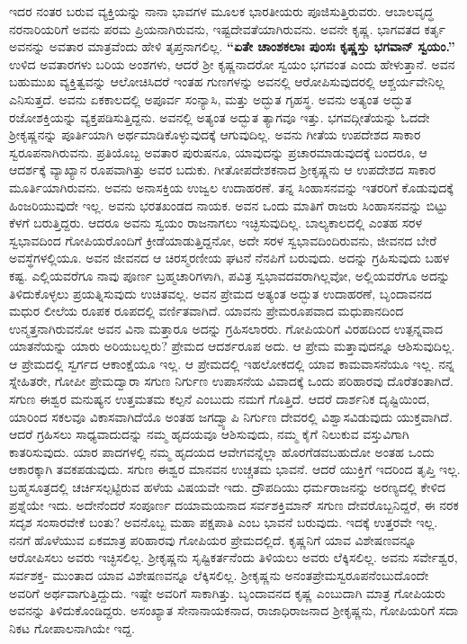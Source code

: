 ಇದರ ನಂತರ ಬರುವ ವ್ಯಕ್ತಿಯನ್ನು ನಾನಾ ಭಾವಗಳ ಮೂಲಕ ಭಾರತೀಯರು ಪೂಜಿಸುತ್ತಿರುವರು. ಆಬಾಲವೃದ್ಧ ನರನಾರಿಯರಿಗೆ ಅವನು ಪರಮ ಪ್ರಿಯನಾಗಿರುವನು, ಇಷ್ಟದೇವತೆಯಾಗಿರುವನು. ಅವನೇ ಕೃಷ್ಣ. ಭಾಗವತದ ಕರ್ತೃ ಅವನನ್ನು ಅವತಾರ ಮಾತ್ರವೆಂದು ಹೇಳಿ ತೃಪ್ತನಾಗಲಿಲ್ಲ. \textbf{“ಏತೇ ಚಾಂಶಕಲಾಃ ಪುಂಸಃ ಕೃಷ್ಣಸ್ತು ಭಗವಾನ್​ ಸ್ವಯಂ.”} ಉಳಿದ ಅವತಾರಗಳು ಬರಿಯ ಅಂಶಗಳು, ಆದರೆ ಶ‍್ರೀ ಕೃಷ್ಣನಾದರೋ ಸ್ವಯಂ ಭಗವಂತ ಎಂದು ಹೇಳುತ್ತಾನೆ. ಅವನ ಬಹುಮುಖ ವ್ಯಕ್ತಿತ್ವವನ್ನು ಆಲೋಚಿಸಿದರೆ ಇಂತಹ ಗುಣಗಳನ್ನು ಅವನಲ್ಲಿ ಆರೋಪಿಸುವುದರಲ್ಲಿ ಆಶ್ಚರ್ಯವೇನಿಲ್ಲ ಎನಿಸುತ್ತದೆ. ಅವನು ಏಕಕಾಲದಲ್ಲಿ ಅಪೂರ್ವ ಸಂನ್ಯಾಸಿ, ಮತ್ತು ಅದ್ಭುತ ಗೃಹಸ್ಥ. ಅವನು ಅತ್ಯಂತ ಅದ್ಭುತ ರಜೋಶಕ್ತಿಯನ್ನು ವ್ಯಕ್ತಪಡಿಸುತ್ತಿದ್ದನು. ಅವನಲ್ಲಿ ಅತ್ಯಂತ ಅದ್ಭುತ ತ್ಯಾಗವೂ ಇತ್ತು. ಭಗವದ್ಗೀತೆಯನ್ನು ಓದದೇ ಶ‍್ರೀಕೃಷ್ಣನನ್ನು ಪೂರ್ತಿಯಾಗಿ ಅರ್ಥಮಾಡಿಕೊಳ್ಳುವುದಕ್ಕೆ ಆಗುವುದಿಲ್ಲ. ಅವನು ಗೀತೆಯ ಉಪದೇಶದ ಸಾಕಾರ ಸ್ವರೂಪನಾಗಿರುವನು. ಪ್ರತಿಯೊಬ್ಬ ಅವತಾರ ಪುರುಷನೂ, ಯಾವುದನ್ನು ಪ್ರಚಾರಮಾಡುವುದಕ್ಕೆ ಬಂದರೂ, ಆ ಆದರ್ಶಕ್ಕೆ ವ್ಯಾಖ್ಯಾನ ರೂಪವಾಗಿತ್ತು ಅವರ ಬದುಕು. ಗೀತೋಪದೇಶಕನಾದ ಶ‍್ರೀಕೃಷ್ಣನು ಆ ಉಪದೇಶದ ಸಾಕಾರ ಮೂರ್ತಿಯಾಗಿರುವನು. ಅವನು ಅನಾಸಕ್ತಿಯ ಉಜ್ವಲ ಉದಾಹರಣೆ. ತನ್ನ ಸಿಂಹಾಸನವನ್ನು ಇತರರಿಗೆ ಕೊಡುವುದಕ್ಕೆ ಹಿಂಜರಿಯುವುದೇ ಇಲ್ಲ. ಅವನು ಭರತಖಂಡದ ನಾಯಕ. ಅವನ ಒಂದು ಮಾತಿಗೆ ರಾಜರು ಸಿಂಹಾಸನವನ್ನು ಬಿಟ್ಟು ಕೆಳಗೆ ಬರುತ್ತಿದ್ದರು. ಆದರೂ ಅವನು ಸ್ವಯಂ ರಾಜನಾಗಲು ಇಚ್ಛಿಸುವುದಿಲ್ಲ. ಬಾಲ್ಯಕಾಲದಲ್ಲಿ ಎಂತಹ ಸರಳ ಸ್ವಭಾವದಿಂದ ಗೋಪಿಯರೊಂದಿಗೆ ಕ್ರೀಡೆಯಾಡುತ್ತಿದ್ದನೋ, ಅದೇ ಸರಳ ಸ್ವಭಾವದಿಂದಿರುವನು, ಜೀವನದ ಬೇರೆ ಅವಸ್ಥೆಗಳಲ್ಲಿಯೂ. ಅವನ ಜೀವನದ ಆ ಚಿರಸ್ಮರಣೀಯ ಘಟನೆ ನೆನಪಿಗೆ ಬರುವುದು. ಅದನ್ನು ಗ್ರಹಿಸುವುದು ಬಹಳ ಕಷ್ಟ. ಎಲ್ಲಿಯವರೆಗೂ ನಾವು ಪೂರ್ಣ ಬ್ರಹ್ಮಚಾರಿಗಳಾಗಿ, ಪವಿತ್ರ ಸ್ವಭಾವದವರಾಗಿಲ್ಲವೋ, ಅಲ್ಲಿಯವರೆಗೂ ಅದನ್ನು ತಿಳಿದುಕೊಳ್ಳಲು ಪ್ರಯತ್ನಿಸುವುದು ಉಚಿತವಲ್ಲ. ಅವನ ಪ್ರೇಮದ ಅತ್ಯಂತ ಅದ್ಭುತ ಉದಾಹರಣೆ, ಬೃಂದಾವನದ ಮಧುರ ಲೀಲೆಯ ರೂಪಕ ರೂಪದಲ್ಲಿ ವರ್ಣಿತವಾಗಿದೆ. ಯಾವನು ಪ್ರೇಮರೂಪವಾದ ಮಧುಪಾನದಿಂದ ಉನ್ಮತ್ತನಾಗಿರುವನೋ ಅವನ ವಿನಾ ಮತ್ತಾರೂ ಅದನ್ನು ಗ್ರಹಿಸಲಾರರು. ಗೋಪಿಯರಿಗೆ ವಿರಹದಿಂದ ಉತ್ಪನ್ನವಾದ ಯಾತನೆಯನ್ನು ಯಾರು ಅರಿಯಬಲ್ಲರು? ಪ್ರೇಮದ ಆದರ್ಶರೂಪ ಅದು. ಆ ಪ್ರೇಮ ಮತ್ತಾವುದನ್ನೂ ಆಶಿಸುವುದಿಲ್ಲ. ಆ ಪ್ರೇಮದಲ್ಲಿ ಸ್ವರ್ಗದ ಆಕಾಂಕ್ಷೆಯೂ ಇಲ್ಲ. ಆ ಪ್ರೇಮದಲ್ಲಿ ಇಹಲೋಕದಲ್ಲಿ ಯಾವ ಕಾಮವಾಸನೆಯೂ ಇಲ್ಲ. ನನ್ನ ಸ್ನೇಹಿತರೇ, ಗೋಪೀ ಪ್ರೇಮದ್ವಾರಾ ಸಗುಣ ನಿರ್ಗುಣ ಉಪಾಸನೆಯ ವಿವಾದಕ್ಕೆ ಒಂದು ಪರಿಹಾರವು ದೊರೆತಂತಾಗಿದೆ. ಸಗುಣ ಈಶ್ವರ ಮನುಷ್ಯನ ಉತ್ತಮತಮ ಕಲ್ಪನೆ ಎಂಬುದು ನಮಗೆ ಗೊತ್ತಿದೆ. ಆದರೆ ದಾರ್ಶನಿಕ ದೃಷ್ಟಿಯಿಂದ, ಯಾರಿಂದ ಸಕಲವೂ ವಿಕಾಸವಾಗಿದೆಯೊ ಅಂತಹ ಜಗದ್ವ್ಯಾಪಿ ನಿರ್ಗುಣ ದೇವರಲ್ಲಿ ವಿಶ್ವಾಸವಿಡುವುದು ಯುಕ್ತವಾಗಿದೆ. ಆದರೆ ಗ್ರಹಿಸಲು ಸಾಧ್ಯವಾದುದನ್ನು ನಮ್ಮ ಹೃದಯವೂ ಆಶಿಸುವುದು, ನಮ್ಮ ಕೈಗೆ ನಿಲುಕುವ ವಸ್ತುವಿಗಾಗಿ ಕಾತರಿಸುವುದು. ಯಾರ ಪಾದಗಳಲ್ಲಿ ನಮ್ಮ ಹೃದಯದ ಆವೇಗವನ್ನೆಲ್ಲಾ ಹೊರಗೆಡವಬಹುದೋ ಅಂತಹ ಒಂದು ಆಕಾರಕ್ಕಾಗಿ ತವಕಪಡುವುದು. ಸಗುಣ ಈಶ್ವರ ಮಾನವನ ಉಚ್ಚತಮ ಭಾವನೆ. ಆದರೆ ಯುಕ್ತಿಗೆ ಇದರಿಂದ ತೃಪ್ತಿ ಇಲ್ಲ. ಬ್ರಹ್ಮಸೂತ್ರದಲ್ಲಿ ಚರ್ಚಿಸಲ್ಪಟ್ಟಿರುವ ಹಳೆಯ ವಿಷಯವೇ ಇದು. ದ್ರೌಪದಿಯು ಧರ್ಮರಾಜನನ್ನು ಅರಣ್ಯದಲ್ಲಿ ಕೇಳಿದ ಪ್ರಶ್ನೆಯೇ ಇದು. ಅದೇನೆಂದರೆ ಸಂಪೂರ್ಣ ದಯಾಮಯನಾದ ಸರ್ವಶಕ್ತಿಮಾನ್​ ಸಗುಣ ದೇವರೊಬ್ಬನಿದ್ದರೆ, ಈ ನರಕ ಸದೃಶ ಸಂಸಾರವೇಕೆ ಬಂತು? ಅವನೊಬ್ಬ ಮಹಾ ಪಕ್ಷಪಾತಿ ಎಂಬ ಭಾವನೆ ಬರುವುದು. ಇದಕ್ಕೆ ಉತ್ತರವೇ ಇಲ್ಲ. ನನಗೆ ಹೊಳೆಯುವ ಏಕಮಾತ್ರ ಪರಿಹಾರವು ಗೋಪಿಯರ ಪ್ರೇಮದಲ್ಲಿದೆ. ಕೃಷ್ಣನಿಗೆ ಯಾವ ವಿಶೇಷಣವನ್ನೂ ಆರೋಪಿಸಲು ಅವರು ಇಚ್ಛಿಸಲಿಲ್ಲ. ಶ‍್ರೀಕೃಷ್ಣನು ಸೃಷ್ಟಿಕರ್ತನೆಂದು ತಿಳಿಯಲು ಅವರು ಲೆಕ್ಕಿಸಲಿಲ್ಲ. ಅವನು ಸರ್ವೇಶ್ವರ, ಸರ್ವಶಕ್ತ- ಮುಂತಾದ ಯಾವ ವಿಶೇಷಣವನ್ನೂ ಲೆಕ್ಕಿಸ\-ಲಿಲ್ಲ. ಶ‍್ರೀಕೃಷ್ಣನು ಅನಂತಪ್ರೇಮಸ್ವರೂಪನೆಂಬುದೊಂದೇ ಅವರಿಗೆ ಅರ್ಥವಾಗುತ್ತಿದ್ದುದು. ಇಷ್ಟೇ ಅವರಿಗೆ ಸಾಕಾಗಿತ್ತು. ಬೃಂದಾವನದ ಕೃಷ್ಣ ಎಂಬುದಾಗಿ ಮಾತ್ರ ಗೋಪಿಯರು ಅವನನ್ನು ತಿಳಿದುಕೊಂಡಿದ್ದರು. ಅಸಂಖ್ಯಾತ ಸೇನಾನಾಯಕನಾದ, ರಾಜಾಧಿರಾಜನಾದ ಶ‍್ರೀಕೃಷ್ಣನು, ಗೋಪಿಯರಿಗೆ ಸದಾ ನಿಕಟ ಗೋಪಾಲನಾಗಿಯೇ ಇದ್ದ.


